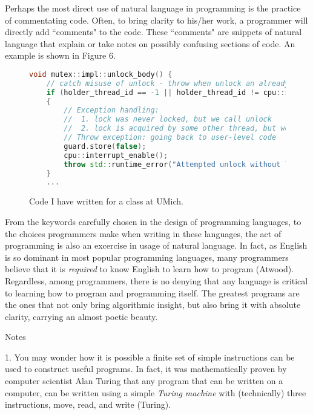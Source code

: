\documentclass[12pt]{article}
\begin{document}
\begin{flushleft}
Perhaps the most direct use of natural language in programming is the
practice of commentating code. Often, to bring clarity to his/her work,
a programmer will directly add ``comments" to the code. These ``comments"
are snippets of natural language that explain or take notes on
possibly confusing sections of code. An example is shown in Figure
6.

\begin{figure}[h]
    \label{fig:os_code}
\centering
\caption[Caption for LOF]{
    Code I have written for a class at UMich.
}
\begin{lstlisting}[language=C++]
void mutex::impl::unlock_body() {
    // catch misuse of unlock - throw when unlock an already unlocked lock
    if (holder_thread_id == -1 || holder_thread_id != cpu::self()->impl_ptr->active_thread_id)
    {
        // Exception handling:
        //  1. lock was never locked, but we call unlock
        //  2. lock is acquired by some other thread, but we call unlock
        // Throw exception: going back to user-level code
        guard.store(false);
        cpu::interrupt_enable();
        throw std::runtime_error("Attempted unlock without locking mutex or unlocking without owning lock!\n");
    }
    ...
\end{lstlisting}
\end{figure}

From the keywords carefully chosen in the design of programming languages,
to the choices programmers make when writing in these languages, the
act of programming is also an excercise in usage of natural language.
In fact, as English is so dominant in most popular programming languages,
many programmers believe that it is \textit{required} to know English
to learn how to program (Atwood).
Regardless, among programmers, there is no denying that any language is
critical to learning how to program and programming itself.
The greatest programs are the ones that not only bring algorithmic
insight, but also bring it with absolute clarity, carrying an
almost poetic beauty.

\newpage

\begin{center}
Notes
\end{center}

1. You may wonder how it is possible a finite set of simple instructions
can be used to construct useful programs. In fact, it was mathematically proven
by computer scientist Alan Turing that any program that can be written on a computer, can be written using
a simple \textit{Turing machine} with (technically) three instructions, move,
read, and write (Turing).


\end{flushleft}
\end{document}
